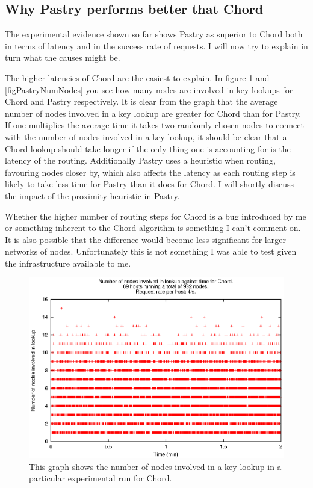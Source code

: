 \subsection{Why Pastry performs better that Chord}
The experimental evidence shown so far shows Pastry as superior to Chord both in terms of latency and in the success rate of requests. I will now try to explain in turn what the causes might be.

\mbox{}

The higher latencies of Chord are the easiest to explain. In figure \ref{figChordNumNodes} and \ref{figPastryNumNodes} you see how many nodes are involved in key lookups for Chord and Pastry respectively. It is clear from the graph that the average number of nodes involved in a key lookup are greater for Chord than for Pastry. If one multiplies the average time it takes two randomly chosen nodes to connect with the number of nodes involved in a key lookup, it should be clear that a Chord lookup should take longer if the only thing one is accounting for is the latency of the routing. Additionally Pastry uses a heuristic when routing, favouring nodes closer by, which also affects the latency as each routing step is likely to take less time for Pastry than it does for Chord. I will shortly discuss the impact of the proximity heuristic in Pastry.

Whether the higher number of routing steps for Chord is a bug introduced by me or something inherent to the Chord algorithm is something I can't comment on. It is also possible that the difference would become less significant for larger networks of nodes. Unfortunately this is not something I was able to test given the infrastructure available to me.

\begin{figure}[!htbp]
  \begin{center}
    \includegraphics[width=0.9\linewidth]{illustrations/nodes_against_time_chord.eps}
    \caption{This graph shows the number of nodes involved in a key lookup in a particular experimental run for Chord.}
    \label{figChordNumNodes}
  \end{center}
\end{figure}

